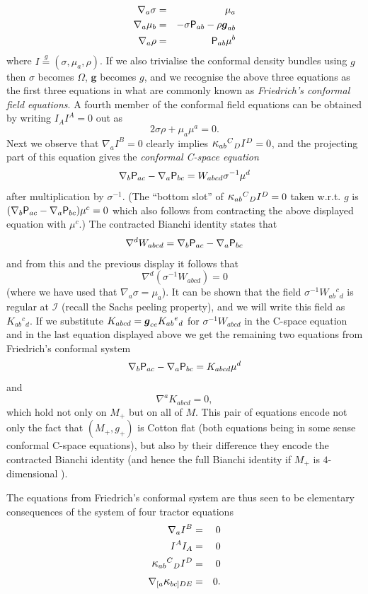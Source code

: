 \documentclass[a4paper,12pt]{amsart}
\newcommand{\kappal}{\mbox{\large{$\kappa$}}}
\def\g{g_+}
\def\M{M_+}
\def\scrI{\mathscr{I}}
\newcommand{\V}{\mbox{\sf P}}
\def\bg{\mbox{\boldmath $g$}}
\theoremstyle{remark}
\begin{document}
\begin{eqnarray*}
\nabla_{a}\sigma & = & \mu_{a}\\
\nabla_{a}\mu_{b} & = & -\sigma \V_{ab}-\rho\boldsymbol{g}_{ab}\\
\nabla_{a}\rho & = & \V_{ab}\mu^{b}
\end{eqnarray*}
where $I\overset{g}{=}(\sigma,\mu_{a},\rho)$. If we also trivialise
the conformal density bundles using $g$ then $\sigma$ becomes $\Omega$,
$\boldsymbol{g}$ becomes $g$, and we recognise the above three equations
as the first three equations in what are commonly known as \emph{Friedrich's
conformal field equations}. A fourth member of the conformal field
equations can be obtained by writing $I_{A}I^{A}=0$ out as
\[
2\sigma\rho+\mu_{a}\mu^{a}=0.
\]
Next we observe that $\nabla_{a}I^{B}=0$ clearly implies $\kappal_{ab}{^{C}}_{D}I^{D}=0$,
and the projecting part of this equation gives the \emph{conformal
C-space equation}
\[
\nabla_{b} \V_{ac}-\nabla_{a}\V_{bc}=W_{abcd}\sigma^{-1}\mu^{d}
\]
after multiplication by $\sigma^{-1}$. (The ``bottom slot'' of
$\kappal_{ab}{^{C}}_{D}I^{D}=0$ taken w.r.t. $g$ is $(\nabla_{b}\V_{ac}-\nabla_{a}\V_{bc})\mu^{c}=0$
which also follows from contracting the above displayed equation with
$\mu^{c}$.) The contracted Bianchi identity states that 
\[
\nabla^{d}W_{abcd}=\nabla_{b}\V_{ac}-\nabla_{a}\V_{bc}
\]
and from this and the previous display it follows that
\[
\nabla^{d}(\sigma^{-1}W_{abcd})=0
\]
(where we have used that $\nabla_{a}\sigma=\mu_{a}$). It can be shown
\cite{Joerg-ConfInf} that the field $\sigma^{-1}W_{ab}{^c}_d$ is regular
at $\scrI$ (recall the Sachs peeling property), and we will write this field as $K_{ab}{^c}_d$. If we substitute $K_{abcd}=\bg_{ce}K_{ab}{^e}_d$ for $\sigma^{-1}W_{abcd}$ in the C-space equation and in the last equation displayed above we get the remaining two equations from Friedrich's conformal system
\[
\nabla_{b}\V_{ac}-\nabla_{a}\V_{bc}=K_{abcd}\mu^{d}
\]
and
\[
\nabla^{a}K_{abcd}=0,
\]
which hold not only on $\M$ but on all of $M$. This pair of equations encode not only the fact that $(\M,\g)$ is Cotton flat (both equations being in some sense conformal C-space equations), but also by their difference they encode the contracted Bianchi identity (and hence the full Bianchi identity if $\M$ is $4$-dimensional \cite{Friedrich-ConfEinsteinEv}).

The equations from Friedrich's conformal system are thus seen to be
elementary consequences of the system of four tractor equations
\begin{eqnarray*} %
\nabla_{a}I^{B} & = & 0\\
I^{A}I_{A} & = & 0\\
\kappal_{ab}{^{C}}_{D}I^{D} & = & 0\\
\nabla_{[a}\kappal_{bc]DE} & = & 0.
\end{eqnarray*}
\end{document}
